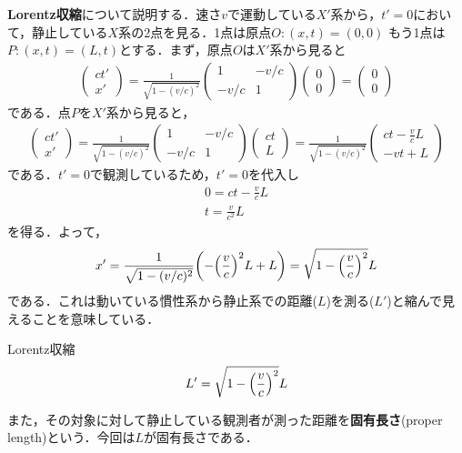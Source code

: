 \documentclass{report}
\begin{document}
  \textbf{Lorentz収縮}について説明する．速さ$v$で運動している$X'$系から，$t'=0$において，静止している$X$系の2点を見る．1点は原点$O:(x,t)=(0,0)$
  もう1点は$P:(x,t)=(L,t)$とする．まず，原点$O$は$X'$系から見ると
  \begin{align}
    \begin{pmatrix}
      ct' \\ x'
    \end{pmatrix}
    =
    \frac{1}{\sqrt{1 - (v/c)^2}}
    \begin{pmatrix}
      1 & -v/c\\
      -v/c & 1
    \end{pmatrix}
    \begin{pmatrix}
      0\\0
    \end{pmatrix}
    =
    \begin{pmatrix}
      0\\0
    \end{pmatrix}
  \end{align}
  である．点$P$を$X'$系から見ると，
  \begin{align}
    \begin{pmatrix}
      ct' \\ x'
    \end{pmatrix}
    =
    \frac{1}{\sqrt{1 - (v/c)^2}}
    \begin{pmatrix}
      1 & -v/c\\
      -v/c & 1
    \end{pmatrix}
    \begin{pmatrix}
      ct\\L
    \end{pmatrix}
    =
    \frac{1}{\sqrt{1 - (v/c)^2}}
    \begin{pmatrix}
      ct - \frac{v}{c}L\\-vt + L
    \end{pmatrix}
  \end{align}
  である．$t'=0$で観測しているため，$t'=0$を代入し
  \begin{align}
    0 = ct - \frac{v}{c}L\\
    t = \frac{v}{c^2}L
  \end{align}
  を得る．よって，
  \begin{align}
    x' = \frac{1}{\sqrt{1 - (v/c)^2}} \qty(-\qty(\frac{v}{c})^2 L + L) = \sqrt{1-\qty(\frac{v}{c})^2}L
  \end{align}
  である．これは動いている慣性系から静止系での距離($L$)を測る($L'$)と縮んで見えることを意味している．
  \begin{itembox}[l]{Lorentz収縮}
    \begin{align}
      L' = \sqrt{1-\qty(\frac{v}{c})^2}L
    \end{align}
  \end{itembox}
  また，その対象に対して静止している観測者が測った距離を\textbf{固有長さ}(proper length)という．今回は$L$が固有長さである．
\end{document}
